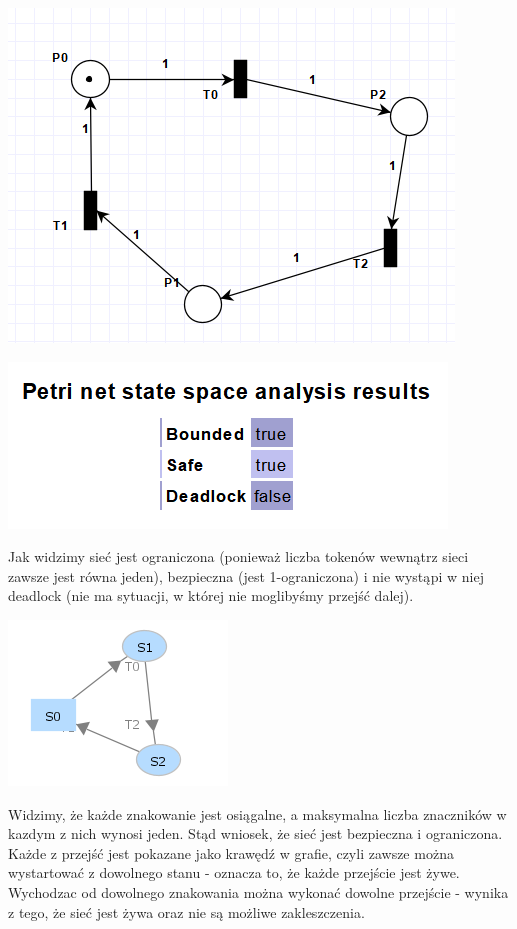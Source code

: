 \documentclass[12pt]{article}
\begin{document}
\begin{center}
\centering
    \includegraphics{cw2.png}
\end{center}

\begin{center}
\centering
    \includegraphics{cw3.png}
\end{center}
Jak widzimy sieć jest ograniczona (ponieważ liczba tokenów wewnątrz sieci zawsze jest równa jeden), bezpieczna (jest 1-ograniczona) i nie wystąpi w niej deadlock (nie ma sytuacji, w której nie moglibyśmy przejść dalej).

\begin{center}
\centering
    \includegraphics{cw4.png}
\end{center}
Widzimy, że każde znakowanie jest osiągalne, a maksymalna liczba znaczników w kazdym z nich wynosi jeden. Stąd wniosek, że sieć jest bezpieczna i ograniczona. Każde z przejść jest pokazane jako krawędź w grafie, czyli zawsze można wystartować z dowolnego stanu - oznacza to, że każde przejście jest żywe. Wychodzac od dowolnego znakowania można wykonać dowolne przejście - wynika z tego, że sieć jest żywa oraz nie są możliwe zakleszczenia.
\end{document}
